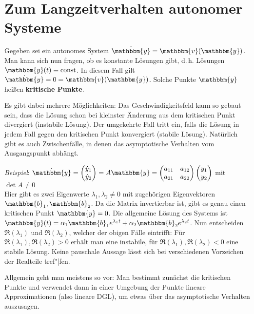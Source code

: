 \section{%
    Zum Langzeitverhalten autonomer Systeme%
}

Gegeben sei ein autonomes System
$\dot{\mathbbm{y}} = \mathbbm{v}(\mathbbm{y})$.
Man kann sich nun fragen, ob es konstante Lösungen gibt, d.\,h.
Lösungen $\mathbbm{y}(t) \equiv \const$.
In diesem Fall gilt $\dot{\mathbbm{y}} = 0 = \mathbbm{v}(\mathbbm{y})$.
Solche Punkte $\mathbbm{y}$ heißen \textbf{kritische Punkte}.

Es gibt dabei mehrere Möglichkeiten:
Das Geschwindigkeitsfeld kann so gebaut sein, dass die Lösung schon bei
kleinster Änderung aus dem kritischen Punkt divergiert (instabile Lösung).
Der umgekehrte Fall tritt ein, falls die Lösung in jedem Fall gegen den
kritischen Punkt konvergiert (stabile Lösung).
Natürlich gibt es auch Zwischenfälle, in denen das asymptotische Verhalten
vom Ausgangspunkt abhängt.

\emph{Beispiel}:
$\dot{\mathbbm{y}} = \begin{pmatrix}\dot{y}_1 \\ \dot{y}_2\end{pmatrix} =
A\mathbbm{y} = \begin{pmatrix}a_{11} & a_{12} \\ a_{21} & a_{22}\end{pmatrix}
\begin{pmatrix}y_1 \\ y_2\end{pmatrix}$ mit $\det A \not= 0$ \\
Hier gibt es zwei Eigenwerte $\lambda_1, \lambda_2 \not= 0$ mit zugehörigen
Eigenvektoren $\mathbbm{b}_1, \mathbbm{b}_2$.
Da die Matrix invertierbar ist, gibt es genau einen kritischen Punkt
$\mathbbm{y} = 0$.
Die allgemeine Lösung des Systems ist
$\mathbbm{y}(t) = \alpha_1 \mathbbm{b}_1 e^{\lambda_1 t} +
\alpha_2 \mathbbm{b}_2 e^{\lambda_2 t}$.
Nun entscheiden $\Re(\lambda_1)$ und $\Re(\lambda_2)$, welcher der obigen
Fälle eintrifft:
Für $\Re(\lambda_1), \Re(\lambda_2) > 0$ erhält man eine instabile,
für $\Re(\lambda_1), \Re(\lambda_2) < 0$ eine stabile Lösung.
Keine pauschale Aussage lässt sich bei verschiedenen Vorzeichen der Realteile
tref"|fen.

Allgemein geht man meistens so vor:
Man bestimmt zunächst die kritischen Punkte und verwendet dann in einer
Umgebung der Punkte lineare Approximationen (also lineare DGL), um etwas
über das asymptotische Verhalten auszusagen.

